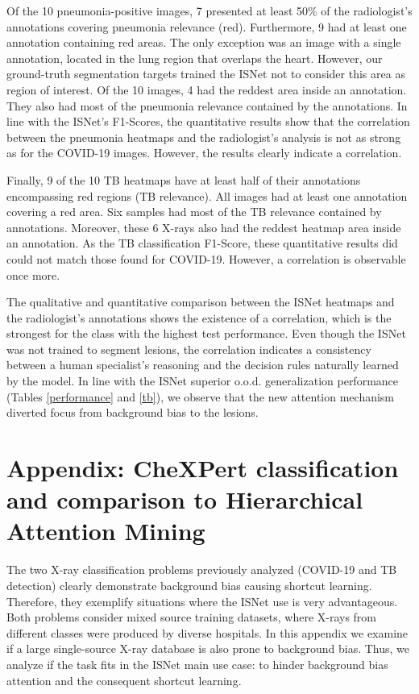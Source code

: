 \documentclass[fleqn,10pt]{wlscirep}
\begin{document}
{Of the 10 pneumonia-positive images, 7 presented at least 50\% of the radiologist's annotations covering pneumonia relevance (red). Furthermore, 9 had at least one annotation containing red areas. The only exception was an image with a single annotation, located in the lung region that overlaps the heart. However, our ground-truth segmentation targets trained the ISNet not to consider this area as region of interest. Of the 10 images, 4 had the reddest area inside an annotation. They also had most of the pneumonia relevance contained by the annotations. In line with the ISNet's F1-Scores, the quantitative results show that the correlation between the pneumonia heatmaps and the radiologist's analysis is not as strong as for the COVID-19 images. However, the results clearly indicate a correlation.

Finally, 9 of the 10 TB heatmaps have at least half of their annotations encompassing red regions (TB relevance). All images had at least one annotation covering a red area. Six samples had most of the TB relevance contained by annotations. Moreover, these 6 X-rays also had the reddest heatmap area inside an annotation. As the TB classification F1-Score, these quantitative results did could not match those found for COVID-19. However, a correlation is observable once more.

The qualitative and quantitative comparison between the ISNet heatmaps and the radiologist's annotations shows the existence of a correlation, which is the strongest for the class with the highest test performance. Even though the ISNet was not trained to segment lesions, the correlation indicates a consistency between a human specialist's reasoning and the decision rules naturally learned by the model. In line with the ISNet superior o.o.d. generalization performance (Tables \ref{performance} and \ref{tb}), we observe that the new attention mechanism diverted focus from background bias to the lesions.



\section{Appendix: CheXPert classification and comparison to Hierarchical Attention Mining}
\label{CheXpertClassification}

The two X-ray classification problems previously analyzed (COVID-19 and TB detection) clearly demonstrate background bias causing shortcut learning. Therefore, they exemplify situations where the ISNet use is very advantageous. Both problems consider mixed source training datasets, where X-rays from different classes were produced by diverse hospitals. In this appendix we examine if a large single-source X-ray database is also prone to background bias. Thus, we analyze if the task fits in the ISNet main use case: to hinder background bias attention and the consequent shortcut learning.

}
\end{document}
